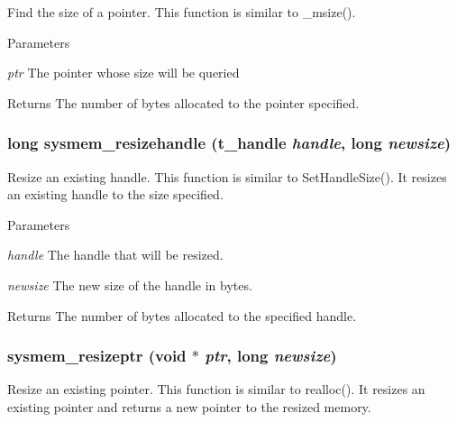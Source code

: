 Find the size of a pointer. This function is similar to \_\-msize().


\begin{DoxyParams}{Parameters}
\item[{\em ptr}]The pointer whose size will be queried \end{DoxyParams}
\begin{DoxyReturn}{Returns}
The number of bytes allocated to the pointer specified. 
\end{DoxyReturn}
\hypertarget{group__memory_ga420520dda6015ec33876b18b860083dd}{
\subsubsection[{sysmem\_\-resizehandle}]{\setlength{\rightskip}{0pt plus 5cm}long sysmem\_\-resizehandle ({\bf t\_\-handle} {\em handle}, \/  long {\em newsize})}}
\label{group__memory_ga420520dda6015ec33876b18b860083dd}


Resize an existing handle. This function is similar to SetHandleSize(). It resizes an existing handle to the size specified.


\begin{DoxyParams}{Parameters}
\item[{\em handle}]The handle that will be resized. \item[{\em newsize}]The new size of the handle in bytes. \end{DoxyParams}
\begin{DoxyReturn}{Returns}
The number of bytes allocated to the specified handle. 
\end{DoxyReturn}
\hypertarget{group__memory_gacad6bca165c7b2849fc81d8449245755}{
\subsubsection[{sysmem\_\-resizeptr}]{ sysmem\_\-resizeptr (void $\ast$ {\em ptr}, \/  long {\em newsize})}}
\label{group__memory_gacad6bca165c7b2849fc81d8449245755}


Resize an existing pointer. This function is similar to realloc(). It resizes an existing pointer and returns a new pointer to the resized memory.


